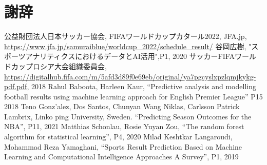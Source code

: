 \documentclass[platex]{suribt}
\begin{document}
\backmatter%
\chapter{謝辞}%

\begin{thebibliography}{2}%
公益財団法人日本サッカー協会, FIFAワールドカップカタール2022, JFA.jp, \url{https://www.jfa.jp/samuraiblue/worldcup_2022/schedule_result/}
谷岡広樹, "スポーツアナリティクスにおけるデータとAI活用",P1, 2020
サッカーFIFAワールドカップロシア大会組織委員会,  \url{https://digitalhub.fifa.com/m/5afd3d89f0e69eb/original/ya7pgcyslxpzlqmjkykg-pdf.pdf}, 2018
Rahul Baboota, Harleen Kaur, “Predictive analysis and modelling football results using machine learning approach for English Premier League” P15 2018
Teno Gonz'alez, Dos Santos, Chunyan Wang Niklas, Carlsson Patrick Lambrix, Linko ping University, Sweden. “Predicting Season Outcomes for the NBA”, P11, 2021
Matthias Schonlau, Rosie Yuyan Zou, “The random forest algorithm for statistical learning”, P4, 2020
Milad Keshtkar Langaroudi, Mohammad Reza Yamaghani, “Sports Result Prediction Based on Machine Learning and Computational Intelligence Approaches A Survey”, P1, 2019


\end{thebibliography}
\appendix%
\chapter{}
\end{document}
